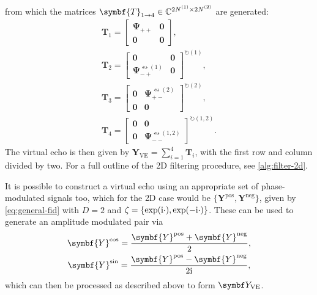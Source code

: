 from which the matrices $\symbf{T}_{1 \rightarrow 4} \in \mathbb{C}^{2 \None
\times 2 \Ntwo}$ are generated:
\begin{subequations}
    \begin{gather}
        \symbf{T}_1 =
        \begin{bmatrix}
            \symbf{\Psi}_{++} & \symbf{0} \\
            \symbf{0} & \symbf{0}
        \end{bmatrix}, \\
        \symbf{T}_2 =
        \begin{bmatrix}
            \symbf{0} & \symbf{0} \\
            \symbf{\Psi}_{-+}^{\leftrightsquigarrow (1)} & \symbf{0}
        \end{bmatrix}^{\circlearrowright (1)}, \\
        \symbf{T}_3 =
        \begin{bmatrix}
            \symbf{0} & \symbf{\Psi}_{+-}^{\leftrightsquigarrow (2)} \\
            \symbf{0} & \symbf{0}
        \end{bmatrix}^{\circlearrowright (2)}, \\
        \symbf{T}_4 =
        \begin{bmatrix}
            \symbf{0} & \symbf{0} \\
            \symbf{0} & \symbf{\Psi}_{--}^{\leftrightsquigarrow (1,2)}
        \end{bmatrix}^{\circlearrowright (1,2)}.
    \end{gather}
\end{subequations}
The virtual echo is then given by $\symbf{Y}_{\text{VE}} = \sum_{i=1}^4
\symbf{T}_i$, with the first row and column divided by two. For a full outline
of the 2D filtering procedure, see \cref{alg:filter-2d}.

It is possible to construct a virtual echo using an appropriate set of
phase-modulated signals too, which for the \ac{2D} case would be $\lbrace
\symbf{Y}^{\text{pos}}, \symbf{Y}^{\text{neg}}\rbrace$, given by
\cref{eq:general-fid} with $D=2$ and  $\zeta = \lbrace \exp(\mathrm{i} \cdot),
\exp(-\mathrm{i}\cdot)\rbrace$. These can be used to generate an amplitude modulated pair via
\begin{subequations}
    \begin{gather}
        \symbf{Y}^{\text{cos}} = \frac{\symbf{Y}^{\text{pos}} + \symbf{Y}^{\text{neg}}}{2},\\
        \symbf{Y}^{\text{sin}} = \frac{\symbf{Y}^{\text{pos}} - \symbf{Y}^{\text{neg}}}{2\iu},
    \end{gather}
\end{subequations}
which can then be processed as described above to form $\bY_{\text{VE}}$.

